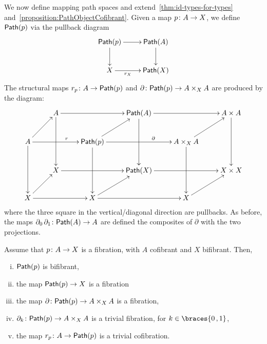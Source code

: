 \documentclass[reqno,10pt,a4paper,oneside,draft]{amsart}
\begin{document}
We now define mapping path spaces and  extend~\cref{thm:id-types-for-types} and~\cref{proposition:PathObjectCofibrant}. Given a map $p \colon A \to X$, we define $\mathsf{Path}(p)$ 
via the pullback diagram
\[
\xymatrix{
\Path(p) \ar[r] \ar[d] & \Path(A) \ar[d] \\
X \ar[r]_-{r_X} & \Path(X) }
\]
The structural maps $r_p \colon A \rightarrow \mathsf{Path}(p)$ and $\partial \colon \mathsf{Path}(p) \rightarrow A \times_{X} A$ are produced by the diagram:
\[
\xymatrix{
& A \ar[rr] \ar[dd] & & \Path(A) \ar[rr] \ar[dd] & & A \times A \ar[dd] \\
A \ar[ur] \ar[rr]^(.6){r}  \ar[dd] & & \Path(p) \ar[ur] \ar[rr]^(.65){\partial} \ar[dd] & & A \times_{X} A \ar[ur] \ar[dd] \\
& X \ar[rr] & & \Path(X) \ar[rr] & & X \times X \\
X \ar[ur] \ar[rr] & & X \ar[rr] \ar[ur] & & X \ar[ur] \\ 
}
\]
where the three square in the vertical/diagonal direction are pullbacks. As before, the maps
$\partial_0 \, \partial_1 \colon \mathsf{Path}(A) \to A$ are defined the composites of $\partial$
with the two projections. 


\begin{theorem}
\label{thm:MainPathObject}
Assume that $p \colon A \rightarrow X $ is a fibration, with $A$ cofibrant and $X$  bifibrant. Then,
\begin{enumerate}[(i)] 
\item \label{thm:MainPathObject:IdBifib} $\mathsf{Path}(p)$ is bifibrant, 
\item the map $\mathsf{Path}(p) \rightarrow X$ is a fibration
\item the map $\partial \colon \mathsf{Path}(p) \rightarrow A \times_{X} A$ is a fibration,
\item $\partial_k \colon \mathsf{Path}(p) \rightarrow A \times_{X} A$  is a trivial fibration, for $k \in \braces{0 \, , 1 }$,
\item the map $r_p \colon A \rightarrow \mathsf{Path}(p)$ is a trivial cofibration.
\end{enumerate}
\end{theorem}
\end{document}
